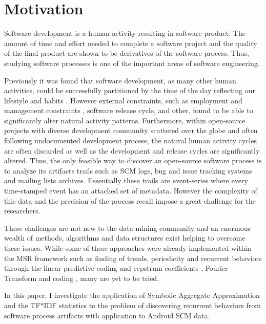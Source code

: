 \documentclass[10pt, conference, compsocconf]{IEEEtran}
\begin{document}
\section{Motivation}
Software development is a human activity resulting in software product. The 
amount of time and effort needed to complete a software project and the 
quality of the final product are shown to be derivatives of the software
process. Thus, studying software processes is one of the important areas of
software engineering. 

Previously it was found that software development, as many other human activities,
could be successfully partitioned by the time of the day reflecting our lifestyle and habits
\cite{citeulike:10396459} \cite{citeulike:10392305}. However external constraints, 
such as employment and management constraints \cite{citeulike:6095797}, 
software release cycle, \cite{citeulike:2739216} and other, found to be able 
to significantly alter natural activity patterns. Furthermore, within open-source 
projects with diverse development community scattered over the globe and 
often following undocumented development process, the natural human activity cycles 
are often discarded as well as the development and release cycles are significantly altered.
Thus, the only feasible way to discover an open-source software process is to analyze 
its artifacts trails such as SCM logs, bug and issue tracking systems and 
mailing lists archives. Essentially these trails are event-series where every 
time-stamped event has an attached set of metadata. 
However the complexity of this data and the precision of the process 
recall impose a great challenge for the researchers.

These challenges are not new to the data-mining community and an enormous wealth 
of methods, algorithms and data structures exist helping to overcome these issues.
While some of these approaches were already implemented within the MSR framework 
such as finding of trends, periodicity and recurrent behaviors through the linear 
predictive coding and cepstrum coefficients \cite{citeulike:3378725}, 
Fourier Transform \cite{citeulike:10377345} and coding \cite{citeulike:10377366},
many are yet to be tried.

In this paper, I investigate the application of 
Symbolic Aggregate Approximation \cite{citeulike:2821475} and the TF$\ast$IDF 
statistics \cite{citeulike:3056638} to the problem of discovering recurrent 
behaviors from software process artifacts with application to Android SCM data.
\end{document}
